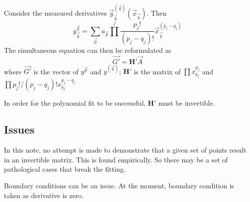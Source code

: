 \documentclass{article}
\begin{document}
Consider the measured derivatives 
$\vec{y}_{\vec{b}}^{(\vec{q})}(\vec{x}_{\vec{b}})$. Then
\begin{equation}
y^{\vec{q}}_{\vec{b}} = \sum_{\vec{p}} a_{\vec{p}} 
  \prod^j \frac{p_j!}{(p_j-q_j)!} \vec{x}_{\vec{b}}^{(p_j-q_j)}
\end{equation}
The simultaneous equation can then be reformulated as
\begin{equation}
\vec{G'} = \mathbf{H'} \vec{A}
\end{equation}
where $\vec{G'}$ is the vector of $y^{\vec{p}}$ and $y^{(\vec{q})}$; $\mathbf{H'}$
is the matrix of $\prod x_{b_j}^{p_j}$ and $\prod p_j!/(p_j-q_j)! x_{b_j}^{p_j-q_j}$

In order for the polynomial fit to be successful, $\mathbf{H'}$ must be
invertible.

\subsection{Issues}
In this note, no attempt is made to demonstrate that a given set of points
result in an invertible matrix. This is found empirically. So there may be a set
of pathological cases that break the fitting.

Boundary conditions can be an issue. At the moment, boundary condition is taken
as derivative is zero.
\end{document}
